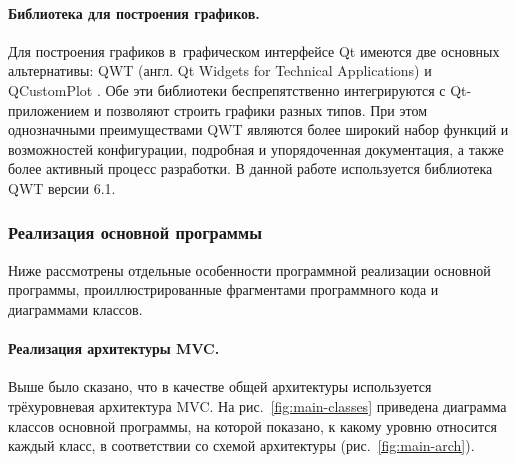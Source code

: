 \documentclass[a4paper, 14pt, titlepage]{extarticle}
\newcommand{\eng}[1]{\foreignlanguage{english}{#1}}
\begin{document}
  \paragraph{Библиотека для построения графиков.}
  Для построения графиков в~графическом интерфейсе Qt имеются две основных альтернативы: QWT (англ.
  \eng{Qt Widgets for Technical Applications}) \cite{qwt} и QCustomPlot \cite{qcustomplot}.  Обе эти
  библиотеки беспрепятственно интегрируются с Qt-приложением и позволяют строить графики разных
  типов. При этом однозначными преимуществами QWT являются более широкий набор функций и
  возможностей конфигурации, подробная и упорядоченная документация, а также более активный процесс разработки.
  В данной работе используется библиотека QWT версии 6.1.

  \subsubsection{Реализация основной программы}\label{sssec:main-impl}

  Ниже рассмотрены отдельные особенности программной реализации основной программы,
  проиллюстрированные фрагментами программного кода и диаграммами классов.

  \paragraph{Реализация архитектуры MVC.}
  Выше было сказано, что в качестве общей архитектуры используется трёхуровневая архитектура MVC. На
  рис.~\ref{fig:main-classes} приведена диаграмма классов основной программы, на которой показано, к
  какому уровню относится каждый класс, в соответствии со схемой архитектуры (рис.~\ref{fig:main-arch}).
\end{document}
